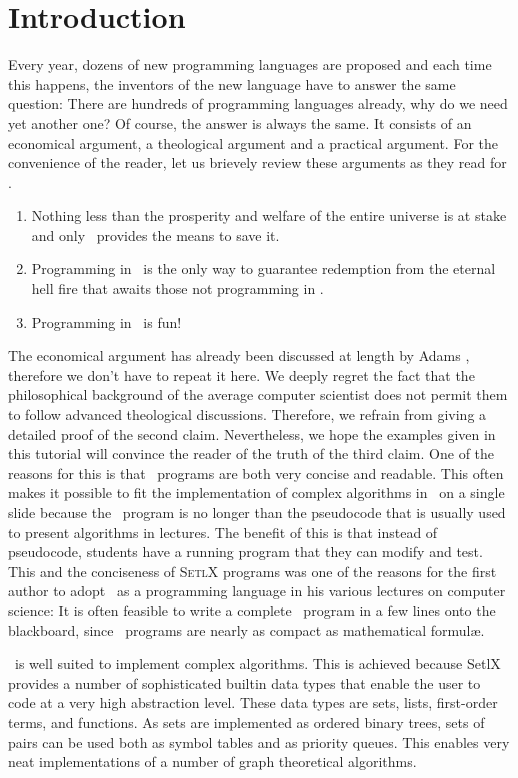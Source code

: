\chapter{Introduction}
Every year, dozens of new programming languages are proposed and each time this
happens,  the inventors of the new language have to answer the same question: 
There are hundreds of programming languages already, why do we need yet another one?  
Of course, the answer is always the same.  It consists of an economical argument, a
theological argument and a practical argument. For the
convenience of the reader, let us brievely review these arguments as they read for \setlx.  
\begin{enumerate}
\item Nothing less than the prosperity and welfare of the entire universe is at
      stake and only \setlx\ provides the means to save it.
\item Programming in \setlx\ is the only way to guarantee redemption from 
      the eternal hell fire that awaits those not programming in \setlx.
\item Programming in \setlx\ is fun!
\end{enumerate}
The economical argument has already been discussed at length by Adams \cite{adams:1980},
therefore we don't have to repeat it here.   We deeply
regret the fact that the philosophical background of the average computer scientist does not permit
them to follow advanced theological discussions.  Therefore, we refrain from giving a
detailed proof of the second claim.  Nevertheless, we hope the examples given in this
tutorial will convince the reader of the truth of the third claim.
  One of the reasons for this is that \setlx\ programs are both very concise and
readable.  This often makes it possible to fit the implementation of complex algorithms in \setlx\ on a
single slide because the \setlx\ program is no longer than the pseudocode that is usually used to
present algorithms in lectures.  The benefit of this is that instead of pseudocode, students have a
running program that they can modify and test. This and the
conciseness of \textsc{SetlX} programs was one of the reasons for
the first author to adopt \setlx\ as a programming language in his various lectures on computer
science: It is often feasible to write a complete \setlx\ program in a few lines 
onto the blackboard, since \setlx\ programs are nearly as compact as mathematical formul\ae.


\setlx\ is well suited to implement complex algorithms. This is achieved because SetlX
provides a number of sophisticated builtin data types that enable the user to code at a very high
abstraction level.
These data types are sets, lists, first-order terms, and functions.  
As sets are implemented as ordered binary trees, sets of pairs can be used both as symbol
tables and as priority queues.  This enables very neat implementations 
of a number of graph theoretical algorithms.

